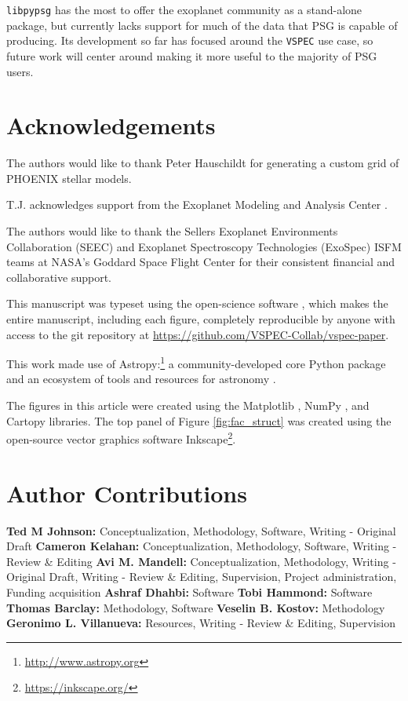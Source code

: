 \documentclass[linenumbers,5p,twocolumn,authoryear]{elsarticle}
\newcommand{\vspec}[1]{\texttt{VSPEC}#1}
\begin{document}
\texttt{libpypsg} has the most to offer the exoplanet community as a stand-alone package, but currently lacks support for much of the data that PSG is capable of producing. Its development so far has focused around the \vspec{} use case, so future work will center around making it more useful to the majority of PSG users.


\section{Acknowledgements}
The authors would like to thank Peter Hauschildt for generating a custom grid of PHOENIX stellar models.

T.J. acknowledges support from the Exoplanet Modeling and Analysis Center \citep[EMAC, ][]{renaud2022}.

The authors would like to thank the Sellers Exoplanet Environments Collaboration (SEEC) and Exoplanet Spectroscopy Technologies (ExoSpec) ISFM teams at NASA's Goddard Space Flight Center for their consistent financial and collaborative support.

This manuscript was typeset using the open-science software \showyourwork, which makes the entire manuscript, including each figure, completely reproducible by anyone with access to the git repository at \url{https://github.com/VSPEC-Collab/vspec-paper}.

This work made use of Astropy:\footnote{\url{http://www.astropy.org}} a community-developed core Python package and an ecosystem of tools and resources for astronomy \citep{astropycollaboration2013,astropycollaboration2018,astropycollaboration2022}.


The figures in this article were created using the Matplotlib \citep{hunter2007}, NumPy \citep{harris2020}, and Cartopy \citep{metoffice2010} libraries. The top panel of Figure \ref{fig:fac_struct} was created using the open-source vector graphics software Inkscape\footnote{\url{https://inkscape.org/}}.

\section{Author Contributions} %
{\bf Ted M Johnson:} Conceptualization, Methodology, Software, Writing - Original Draft
{\bf Cameron Kelahan:} Conceptualization, Methodology, Software, Writing - Review \& Editing
{\bf Avi M. Mandell:} Conceptualization, Methodology, Writing - Original Draft, Writing - Review \& Editing, Supervision, Project administration, Funding acquisition
{\bf Ashraf Dhahbi:} Software
{\bf Tobi Hammond:} Software
{\bf Thomas Barclay:} Methodology, Software
{\bf Veselin B. Kostov:} Methodology
{\bf Geronimo L. Villanueva:} Resources, Writing - Review \& Editing, Supervision




\end{document}

